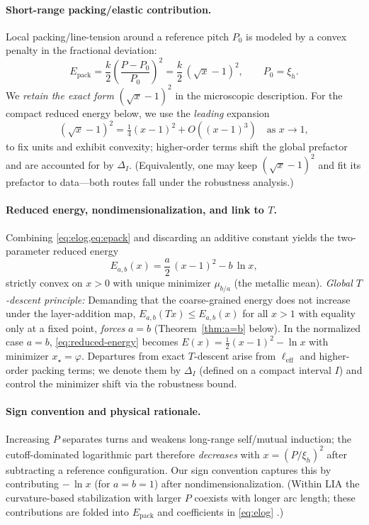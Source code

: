\documentclass[11pt]{article}
\theoremstyle{remark}
\theoremstyle{definition}
\newcommand{\ph}{\varphi}
\begin{document}
\paragraph{Short-range packing/elastic contribution.}
Local packing/line-tension around a reference pitch $P_0$ is modeled by a convex penalty in the fractional deviation:
\begin{equation}
E_{\text{pack}}
=\frac{k}{2}\left(\frac{P-P_0}{P_0}\right)^2
=\frac{k}{2}\,(\sqrt{x}-1)^2,
\qquad P_0=\xi_h.
\label{eq:epack}
\end{equation}
We \emph{retain the exact form} $(\sqrt{x}-1)^2$ in the microscopic description. For the compact reduced energy below, we use the \emph{leading} expansion 
\begin{equation}
(\sqrt{x}-1)^2=\tfrac{1}{4}(x-1)^2+O((x-1)^3) \quad \text{as } x\to 1,
\end{equation}
to fix units and exhibit convexity; higher-order terms shift the global prefactor and are accounted for by $\Delta_I$. (Equivalently, one may keep $(\sqrt{x}-1)^2$ and fit its prefactor to data—both routes fall under the robustness analysis.)

\paragraph{Reduced energy, nondimensionalization, and link to $T$.}
Combining \cref{eq:elog,eq:epack} and discarding an additive constant yields the two-parameter reduced energy
\begin{equation}
E_{a,b}(x) = \frac{a}{2}\,(x-1)^2 - b\,\ln x,
\label{eq:reduced-energy}
\end{equation}
strictly convex on $x>0$ with unique minimizer $\mu_{b/a}$ (the metallic mean). \emph{Global $T$-descent principle:} Demanding that the coarse-grained energy does not increase under the layer-addition map, $E_{a,b}(Tx)\le E_{a,b}(x)$ for all $x>1$ with equality only at a fixed point, \emph{forces} $a=b$ (Theorem~\ref{thm:a=b} below). In the normalized case $a=b$, \eqref{eq:reduced-energy} becomes $E(x)=\tfrac12(x-1)^2-\ln x$ with minimizer $x_\star=\ph$. Departures from exact $T$-descent arise from $\ell_{\mathrm{eff}}$ and higher-order packing terms; we denote them by $\Delta_I$ (defined on a compact interval $I$) and control the minimizer shift via the robustness bound.

\paragraph{Sign convention and physical rationale.}
Increasing $P$ separates turns and weakens long-range self/mutual induction; the cutoff-dominated logarithmic part therefore \emph{decreases} with $x=(P/\xi_h)^2$ after subtracting a reference configuration. Our sign convention captures this by contributing $-\,\ln x$ (for $a=b=1$) after nondimensionalization. (Within LIA the curvature-based stabilization with larger $P$ coexists with longer arc length; these contributions are folded into $E_{\text{pack}}$ and coefficients in \cref{eq:elog} \cite{Widnall1972,FukumotoOkulov2005}.)
\end{document}
